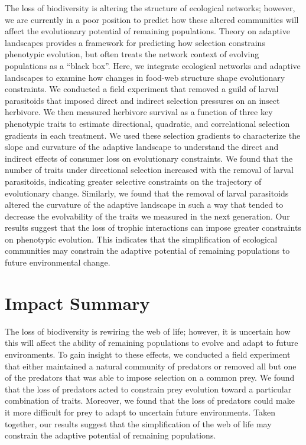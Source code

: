 \documentclass[11pt,]{article}
\begin{document}
The loss of biodiversity is altering the structure of ecological
networks; however, we are currently in a poor position to predict how
these altered communities will affect the evolutionary potential of
remaining populations. Theory on adaptive landscapes provides a
framework for predicting how selection constrains phenotypic evolution,
but often treats the network context of evolving populations as a
``black box''. Here, we integrate ecological networks and adaptive
landscapes to examine how changes in food-web structure shape
evolutionary constraints. We conducted a field experiment that removed a
guild of larval parasitoids that imposed direct and indirect selection
pressures on an insect herbivore. We then measured herbivore survival as
a function of three key phenotypic traits to estimate directional,
quadratic, and correlational selection gradients in each treatment. We
used these selection gradients to characterize the slope and curvature
of the adaptive landscape to understand the direct and indirect effects
of consumer loss on evolutionary constraints. We found that the number
of traits under directional selection increased with the removal of
larval parasitoids, indicating greater selective constraints on the
trajectory of evolutionary change. Similarly, we found that the removal
of larval parasitoids altered the curvature of the adaptive landscape in
such a way that tended to decrease the evolvability of the traits we
measured in the next generation. Our results suggest that the loss of
trophic interactions can impose greater constraints on phenotypic
evolution. This indicates that the simplification of ecological
communities may constrain the adaptive potential of remaining
populations to future environmental change.

\newpage

\section{Impact Summary}\label{impact-summary}

The loss of biodiversity is rewiring the web of life; however, it is
uncertain how this will affect the ability of remaining populations to
evolve and adapt to future environments. To gain insight to these
effects, we conducted a field experiment that either maintained a
natural community of predators or removed all but one of the predators
that was able to impose selection on a common prey. We found that the
loss of predators acted to constrain prey evolution toward a particular
combination of traits. Moreover, we found that the loss of predators
could make it more difficult for prey to adapt to uncertain future
environments. Taken together, our results suggest that the
simplification of the web of life may constrain the adaptive potential
of remaining populations.
\end{document}

